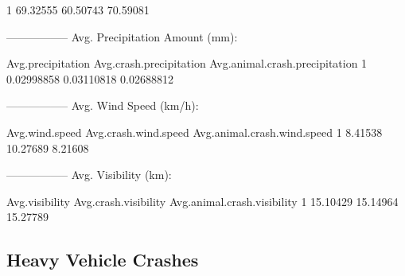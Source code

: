 \documentclass[11pt, a4paper]{article}
\begin{document}
\begin{Schunk}
\begin{Soutput}
1     69.32555           60.50743                  70.59081
\end{Soutput}
\begin{Soutput}
-----------------
Avg. Precipitation Amount (mm):
\end{Soutput}
\begin{Soutput}
  Avg.precipitation Avg.crash.precipitation Avg.animal.crash.precipitation
1        0.02998858              0.03110818                     0.02688812
\end{Soutput}
\begin{Soutput}
-----------------
Avg. Wind Speed (km/h):
\end{Soutput}
\begin{Soutput}
  Avg.wind.speed Avg.crash.wind.speed Avg.animal.crash.wind.speed
1        8.41538             10.27689                     8.21608
\end{Soutput}
\begin{Soutput}
-----------------
Avg. Visibility (km):
\end{Soutput}
\begin{Soutput}
  Avg.visibility Avg.crash.visibility Avg.animal.crash.visibility
1       15.10429             15.14964                    15.27789
\end{Soutput}
\end{Schunk}



\pagebreak
\subsection{Heavy Vehicle Crashes}
\end{document}
